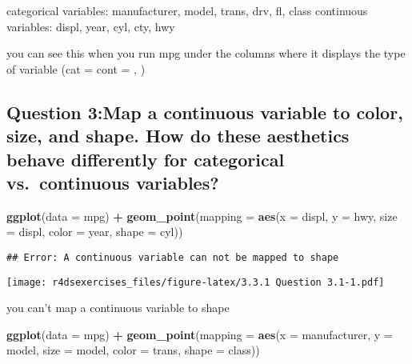 \documentclass[
]{book}
\newenvironment{Shaded}{\begin{snugshade}}{\end{snugshade}}
\newcommand{\DataTypeTok}[1]{\textcolor[rgb]{0.13,0.29,0.53}{#1}}
\newcommand{\KeywordTok}[1]{\textcolor[rgb]{0.13,0.29,0.53}{\textbf{#1}}}
\newcommand{\NormalTok}[1]{#1}
\newcommand{\OperatorTok}[1]{\textcolor[rgb]{0.81,0.36,0.00}{\textbf{#1}}}
\newcommand{\StringTok}[1]{\textcolor[rgb]{0.31,0.60,0.02}{#1}}
\begin{document}
categorical variables: manufacturer, model, trans, drv, fl, class
continuous variables: displ, year, cyl, cty, hwy

you can see this when you run mpg under the columns where it displays the type of variable (cat = cont = , )

\hypertarget{question-3map-a-continuous-variable-to-color-size-and-shape.-how-do-these-aesthetics-behave-differently-for-categorical-vs.-continuous-variables}{%
\subsection{Question 3:Map a continuous variable to color, size, and shape. How do these aesthetics behave differently for categorical vs.~continuous variables?}\label{question-3map-a-continuous-variable-to-color-size-and-shape.-how-do-these-aesthetics-behave-differently-for-categorical-vs.-continuous-variables}}

\begin{Shaded}
\begin{Highlighting}[]
\KeywordTok{ggplot}\NormalTok{(}\DataTypeTok{data =}\NormalTok{ mpg) }\OperatorTok{+}\StringTok{ }
\StringTok{  }\KeywordTok{geom_point}\NormalTok{(}\DataTypeTok{mapping =} \KeywordTok{aes}\NormalTok{(}\DataTypeTok{x =}\NormalTok{ displ, }\DataTypeTok{y =}\NormalTok{ hwy, }\DataTypeTok{size =}\NormalTok{ displ, }\DataTypeTok{color =}\NormalTok{ year, }\DataTypeTok{shape =}\NormalTok{ cyl))}
\end{Highlighting}
\end{Shaded}

\begin{verbatim}
## Error: A continuous variable can not be mapped to shape
\end{verbatim}

\texttt{[image: r4dsexercises\_files/figure-latex/3.3.1 Question 3.1-1.pdf]}

you can't map a continuous variable to shape

\begin{Shaded}
\begin{Highlighting}[]
\KeywordTok{ggplot}\NormalTok{(}\DataTypeTok{data =}\NormalTok{ mpg) }\OperatorTok{+}
\StringTok{  }\KeywordTok{geom_point}\NormalTok{(}\DataTypeTok{mapping =} \KeywordTok{aes}\NormalTok{(}\DataTypeTok{x =}\NormalTok{ manufacturer, }\DataTypeTok{y =}\NormalTok{ model, }\DataTypeTok{size =}\NormalTok{ model, }\DataTypeTok{color =}\NormalTok{ trans, }\DataTypeTok{shape =}\NormalTok{ class))}
\end{Highlighting}
\end{Shaded}
\end{document}
